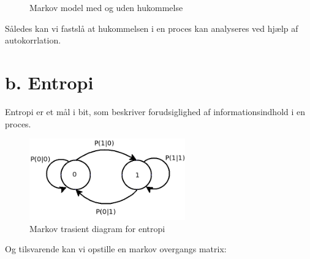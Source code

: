  \begin{figure}[!h]
	\centering
	\caption{Markov model med og uden hukommelse }
	\label{fig:part2_markov}
\end{figure}
Således kan vi fastslå at hukommelsen i en proces kan analyseres ved hjælp af autokorrlation.

\section{b. Entropi }
Entropi er et mål i bit, som beskriver forudsiglighed af informationsindhold i en proces.

 \begin{figure}[!h]
	\centering
	\includegraphics[width=0.6\textwidth]{resources/part2_entropi_diagram}
	\caption{Markov trasient diagram for entropi }
	\label{fig:part2_7}
\end{figure}
Og tilsvarende kan vi opstille en markov overgangs matrix:

